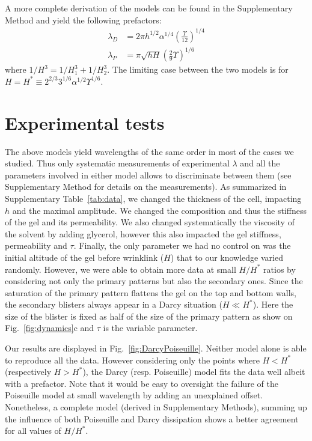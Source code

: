 \documentclass[twocolumn,superscriptaddress,showpacs,preprintnumbers,
amsmath,amssymb,prl]{revtex4-1}
\begin{document}
A more complete derivation of the models can be found in the Supplementary Method and yield the following prefactors:
\begin{align}
\lambda_D &= 2\pi h^{1/2}\alpha^{1/4}\left(\frac{\Upsilon}{12}\right)^{1/4}\\
\lambda_P &= \pi\sqrt{hH}\left(\frac{2}{9}\Upsilon\right)^{1/6}
\end{align}
where $1/H^3 = 1/H_1^3 + 1/H_2^3$. The limiting case between the two models is for $H = H^* \equiv 2^{2/3} 3^{1/6} \alpha^{1/2} \Upsilon^{1/6}$.



\section*{Experimental tests}

The above models yield wavelengths of the same order in most of the cases we studied. Thus only systematic measurements of experimental $\lambda$ and all the parameters involved in either model allows to discriminate between them (see Supplementary Method for details on the measurements). As summarized in Supplementary Table~\ref{tab:data}, we changed the thickness of the cell, impacting $h$ and the maximal amplitude. We changed the composition and thus the stiffness of the gel and its permeability. We also changed systematically the viscosity of the solvent by adding glycerol, however this also impacted the gel stiffness, permeability and $\tau$. Finally, the only parameter we had no control on was the initial altitude of the gel before wrinklink ($H$) that to our knowledge varied randomly. However, we were able to obtain more data at small $H/H^*$ ratios by considering not only the primary patterns but also the secondary ones. Since the saturation of the primary pattern flattens the gel on the top and bottom walls, the secondary blisters always appear in a Darcy situation ($H\ll H^*$). Here the size of the blister is fixed as half of the size of the primary pattern as show on Fig.~\ref{fig:dynamics}c and $\tau$ is the variable parameter.

Our results are displayed in Fig.~\ref{fig:DarcyPoiseuille}. Neither model alone is able to reproduce all the data. However considering only the points where $H<H^*$ (respectively $H>H^*$), the Darcy (resp. Poiseuille) model fits the data well albeit with a prefactor. Note that it would be easy to oversight the failure of the Poiseuille model at small wavelength by adding an unexplained offset. Nonetheless, a complete model (derived in Supplementary Methods), summing up the influence of both Poiseuille and Darcy dissipation shows a better agreement for all values of $H/H^*$.
\end{document}
